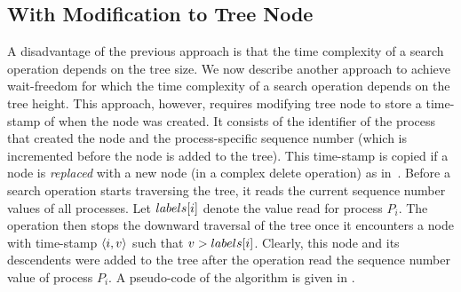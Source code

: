 \begin{limitscope}
\section{With Modification to Tree Node}
A disadvantage of the previous approach is that the time complexity of a search operation depends on the tree size. We now describe another approach to achieve wait-freedom for which the time complexity of a search operation depends on the tree height. This approach, however, requires modifying tree node to store a time-stamp of when the node was created. It consists of the identifier of the process that created the node and the process-specific sequence number (which is incremented before the node is added to the tree). This time-stamp is copied if a node is \emph{replaced} with a new node (in a complex delete operation) as in~\cite{RamMit:2015:ICDCN}. Before a search operation starts traversing the tree, it reads the current sequence number values of all processes. Let $labels[i]$ denote the value read for process $P_i$. The operation then stops the downward traversal of the tree once it encounters a node with time-stamp $\langle i,v \rangle$ such that $v > labels[i]$. Clearly, this node and its descendents were added to the tree after the operation read the sequence number value of process $P_i$.
A pseudo-code of the algorithm is given in .
\end{limitscope}